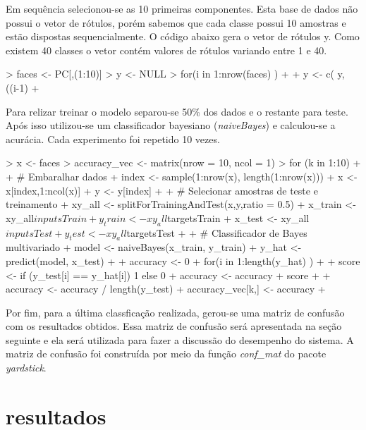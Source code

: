 \documentclass[12pt]{article}
\begin{document}
  \par Em sequência selecionou-se as 10 primeiras componentes. Esta base de dados não possui o vetor de rótulos, porém sabemos que cada classe possui 10 amostras e estão dispostas sequencialmente. O código abaixo gera o vetor de rótulos y. Como existem 40 classes o vetor contém valores de rótulos variando entre 1 e 40.
\begin{Schunk}
\begin{Sinput}
> faces <- PC[,(1:10)]
> y <- NULL
> for(i in 1:nrow(faces) )
+ {
+   y <- c( y, ((i-1) %
+ }
\end{Sinput}
\end{Schunk}

  \par Para relizar  treinar o modelo separou-se 50\% dos dados e o restante para teste. Após isso utilizou-se um classificador bayesiano (\textit{naiveBayes}) e calculou-se a acurácia. Cada experimento foi repetido 10 vezes. 
  
\begin{Schunk}
\begin{Sinput}
> x <- faces
> accuracy_vec <- matrix(nrow = 10, ncol = 1)
> for (k in 1:10)
+ {
+   # Embaralhar dados
+   index <- sample(1:nrow(x), length(1:nrow(x)))
+   x <- x[index,1:ncol(x)]
+   y <- y[index]
+   
+   # Selecionar amostras de teste e treinamento
+   xy_all <- splitForTrainingAndTest(x,y,ratio = 0.5)
+   x_train <- xy_all$inputsTrain
+   y_train <- xy_all$targetsTrain
+   x_test <- xy_all$inputsTest
+   y_test <- xy_all$targetsTest
+   
+   # Classificador de Bayes multivariado
+   model <- naiveBayes(x_train, y_train)
+   y_hat <- predict(model, x_test)
+   
+   accuracy <- 0
+   for(i in 1:length(y_hat) )
+   {
+     score <- if (y_test[i] == y_hat[i]) 1 else 0
+     accuracy <- accuracy + score
+   }
+   accuracy <- accuracy / length(y_test)
+   accuracy_vec[k,] <- accuracy 
+ }
\end{Sinput}
\end{Schunk}

\par Por fim, para a última classficação realizada, gerou-se uma matriz de confusão com os resultados obtidos. Essa matriz de confusão será apresentada na seção seguinte e ela será utilizada para fazer a discussão do desempenho do sistema. A matriz de confusão foi construída por meio da função \textit{conf\_mat} do pacote \textit{yardstick}.

\section{resultados}
\end{document}
